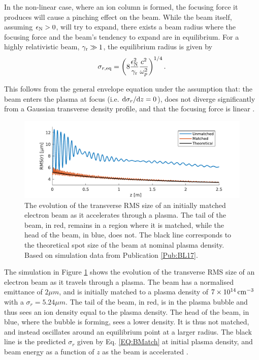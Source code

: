 In the non-linear case, where an ion column is formed, the focusing force it produces will cause a pinching effect on the beam. While the beam itself, assuming $\epsilon_{\mathrm{N}} > 0$, will try to expand, there exists a beam radius where the focusing force and the beam's tendency to expand are in equilibrium. For a highly relativistic beam, $\gamma_{\mathrm{r}} \gg 1$, the equilibrium radius is given by \cite{krall:1995}
\begin{equation}
    \sigma_{r,\mathrm{eq}} = \left( 8 \frac{\epsilon_{\mathrm{N}}^2}{\gamma_{\mathrm{r}}} \frac{c^2}{\omega_{p}^2} \right)^{1/4}. \label{EQ:BMatch}
\end{equation}

This follows from the general envelope equation \cite{lee:1976} under the assumption that: the beam enters the plasma at focus (i.e. $\mathrm{d}\sigma_{r}/\mathrm{d} z = 0$), does not diverge significantly from a Gaussian transverse density profile, and that the focusing force is linear \cite{krall:1995}.

\begin{figure}[hbt]
    \centering
    \includegraphics[width=0.875\linewidth,trim={0mm 0mm 0mm 0mm},clip]{figures/BeamMatching}
    \caption{\label{Fig:BPI:Match} The evolution of the transverse RMS size of an initially matched electron beam as it accelerates through a plasma. The tail of the beam, in red, remains in a region where it is matched, while the head of the beam, in blue, does not. The black line corresponds to the theoretical spot size of the beam at nominal plasma density. Based on simulation data from Publication \ref{Pub:BL17}.}
\end{figure}

The simulation in Figure \ref{Fig:BPI:Match} shows the evolution of the transverse RMS size of an electron beam as it travels through a plasma. The beam has a normalised emittance of $2\unit{\mu m}$, and is initially matched to a plasma density of $7\times 10^{14}\,\mathrm{cm}^{-3}$ with a $\sigma_{r} = 5.24\unit{\mu m}$. The tail of the beam, in red, is in the plasma bubble and thus sees an ion density equal to the plasma density. The head of the beam, in blue, where the bubble is forming, sees a lower density. It is thus not matched, and instead oscillates around an equilibrium point at a larger radius. The black line is the predicted $\sigma_{r}$ given by Eq. \ref{EQ:BMatch} at initial plasma density, and beam energy as a function of $z$ as the beam is accelerated \cite{berglyd_olsen:2018}.

